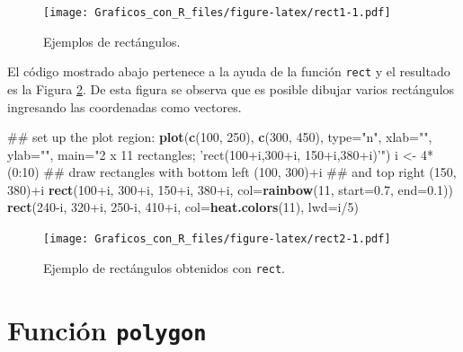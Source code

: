\documentclass[10pt,]{krantz}
\makeatletter
\newenvironment{Shaded}{\begin{snugshade}}{\end{snugshade}}
\newcommand{\KeywordTok}[1]{\textcolor[rgb]{0.13,0.29,0.53}{\textbf{{#1}}}}
\newcommand{\DataTypeTok}[1]{\textcolor[rgb]{0.13,0.29,0.53}{{#1}}}
\newcommand{\DecValTok}[1]{\textcolor[rgb]{0.00,0.00,0.81}{{#1}}}
\newcommand{\FloatTok}[1]{\textcolor[rgb]{0.00,0.00,0.81}{{#1}}}
\newcommand{\StringTok}[1]{\textcolor[rgb]{0.31,0.60,0.02}{{#1}}}
\newcommand{\NormalTok}[1]{{#1}}
\newenvironment{kframe}{%
\medskip{}
\setlength{\fboxsep}{.8em}
 \def\at@end@of@kframe{}%
 \ifinner\ifhmode%
  \def\at@end@of@kframe{\end{minipage}}%
  \begin{minipage}{\columnwidth}%
 \fi\fi%
 \def\FrameCommand##1{\hskip\@totalleftmargin \hskip-\fboxsep
 \colorbox{shadecolor}{##1}\hskip-\fboxsep
     \hskip-\linewidth \hskip-\@totalleftmargin \hskip\columnwidth}%
 \MakeFramed {\advance\hsize-\width
   \@totalleftmargin\z@ \linewidth\hsize
   \@setminipage}}%
 {\par\unskip\endMakeFramed%
 \at@end@of@kframe}
\renewenvironment{Shaded}{\begin{kframe}}{\end{kframe}}
\makeatother
\begin{document}
\begin{figure}[htbp]
\centering
\texttt{[image: Graficos\_con\_R\_files/figure-latex/rect1-1.pdf]}
\caption{\label{fig:rect1}Ejemplos de rectángulos.}
\end{figure}

El código mostrado abajo pertenece a la ayuda de la función
\texttt{rect} y el resultado es la Figura \ref{fig:rect2}. De esta
figura se observa que es posible dibujar varios rectángulos ingresando
las coordenadas como vectores.

\begin{Shaded}
\begin{Highlighting}[]
\NormalTok{## set up the plot region:}
\KeywordTok{plot}\NormalTok{(}\KeywordTok{c}\NormalTok{(}\DecValTok{100}\NormalTok{, }\DecValTok{250}\NormalTok{), }\KeywordTok{c}\NormalTok{(}\DecValTok{300}\NormalTok{, }\DecValTok{450}\NormalTok{), }\DataTypeTok{type=}\StringTok{"n"}\NormalTok{, }\DataTypeTok{xlab=}\StringTok{""}\NormalTok{, }\DataTypeTok{ylab=}\StringTok{""}\NormalTok{,}
     \DataTypeTok{main=}\StringTok{"2 x 11 rectangles; 'rect(100+i,300+i, 150+i,380+i)'"}\NormalTok{)}
\NormalTok{i <-}\StringTok{ }\DecValTok{4}\NormalTok{*(}\DecValTok{0}\NormalTok{:}\DecValTok{10}\NormalTok{)}
\NormalTok{## draw rectangles with bottom left (100, 300)+i}
\NormalTok{## and top right (150, 380)+i}
\KeywordTok{rect}\NormalTok{(}\DecValTok{100}\NormalTok{+i, }\DecValTok{300}\NormalTok{+i, }\DecValTok{150}\NormalTok{+i, }\DecValTok{380}\NormalTok{+i, }\DataTypeTok{col=}\KeywordTok{rainbow}\NormalTok{(}\DecValTok{11}\NormalTok{, }\DataTypeTok{start=}\FloatTok{0.7}\NormalTok{, }\DataTypeTok{end=}\FloatTok{0.1}\NormalTok{))}
\KeywordTok{rect}\NormalTok{(}\DecValTok{240}\NormalTok{-i, }\DecValTok{320}\NormalTok{+i, }\DecValTok{250}\NormalTok{-i, }\DecValTok{410}\NormalTok{+i, }\DataTypeTok{col=}\KeywordTok{heat.colors}\NormalTok{(}\DecValTok{11}\NormalTok{), }\DataTypeTok{lwd=}\NormalTok{i/}\DecValTok{5}\NormalTok{)}
\end{Highlighting}
\end{Shaded}

\begin{figure}[htbp]
\centering
\texttt{[image: Graficos\_con\_R\_files/figure-latex/rect2-1.pdf]}
\caption{\label{fig:rect2}Ejemplo de rectángulos obtenidos con
\texttt{rect}.}
\end{figure}

\section{\texorpdfstring{Función \texttt{polygon} 
}{Función polygon  }}\label{funcion-polygon}
\end{document}
